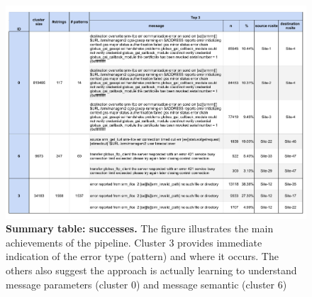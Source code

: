 \begin{landscape}
\begin{figure}
    \centering
    \includegraphics[width=\linewidth]{figures/510_results/cluster-summary-successes.pdf}
    \caption{\textbf{Summary table: successes.}
    The figure illustrates the main achievements of the pipeline. 
    Cluster 3 provides immediate indication of the error type (pattern) and where it occurs.
    The others also suggest the approach is actually learning to understand message parameters (cluster 0) and message semantic (cluster 6)
    }
    \label{fig:cluster_summary:successes}
\end{figure}
\end{landscape}

